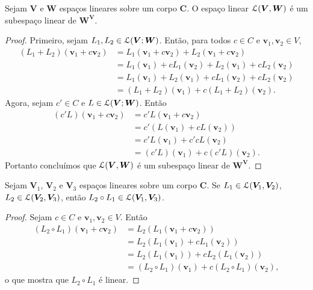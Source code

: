 \begin{prop}
Sejam $\bm V$ e $\bm W$ espaços lineares sobre um corpo $\bm C$. O espaço linear $\mathcal{L}(\bm V,\bm W)$ é um subespaço linear de $\bm {W^V}$.
\end{prop}
\begin{proof}
	Primeiro, sejam $L_1,L_2 \in \mathcal{L}(\bm V;\bm W)$. Então, para todos $c \in C$ e $\bm v_1,\bm v_2 \in V$,
	\begin{align*}
	(L_1+L_2)(\bm v_1+c\bm v_2)&=L_1(\bm v_1+c\bm v_2)+L_2(\bm v_1+c\bm v_2) \\
	&=L_1(\bm v_1)+cL_1(\bm v_2)+L_2(\bm v_1)+cL_2(\bm v_2) \\
	&=L_1(\bm v_1)+L_2(\bm v_1)+cL_1(\bm v_2)+cL_2(\bm v_2) \\
	&=(L_1+L_2)(\bm v_1)+c(L_1+L_2)(\bm v_2).
	\end{align*}
	Agora, sejam $c' \in C$ e $L \in \mathcal{L}(\bm V;\bm W)$. Então
	\begin{align*}
	(c'L)(\bm v_1+c\bm v_2)&=c'L(\bm v_1+c\bm v_2) \\
	&=c'(L(\bm v_1)+cL(\bm v_2)) \\
	&= c'L(\bm v_1)+c'cL(\bm v_2) \\
	&= (c'L)(\bm v_1)+c(c'L)(\bm v_2).
	\end{align*}
Portanto concluímos que $\mathcal{L}(\bm V,\bm W)$ é um subespaço linear de $\bm {W^V}$.
\end{proof}

\begin{prop}
Sejam $\bm V_1$, $\bm V_2$ e $\bm V_3$ espaços lineares sobre um corpo $\bm C$. Se $L_1 \in \mathcal{L}(\bm V_1,\bm V_2)$, $L_2 \in \mathcal{L}(\bm V_2,\bm V_3)$, então $L_2 \circ L_1 \in \mathcal{L}(\bm V_1,\bm V_3)$.
\end{prop}
\begin{proof}
	Sejam $c \in C$ e $\bm v_1,\bm v_2 \in V$. Então
	\begin{align*}
	(L_2 \circ L_1)(\bm v_1+c\bm v_2) &= L_2(L_1(\bm v_1+c\bm v_2)) \\
	&=L_2(L_1(\bm v_1)+cL_1(\bm v_2)) \\
	&=L_2(L_1(\bm v_1))+cL_2(L_1(\bm v_2)) \\
	&= (L_2 \circ L_1)(\bm v_1)+c(L_2 \circ L_1)(\bm v_2),
	\end{align*}
o que mostra que $L_2 \circ L_1$ é linear.
\end{proof}


